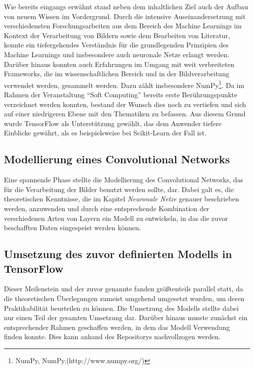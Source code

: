 Wie bereits eingangs erwähnt stand neben dem inhaltlichen Ziel auch der Aufbau von neuem Wissen im Vordergrund. Durch die
intensive Auseinandersetzung mit verschiedensten Forschungsarbeiten aus dem Bereich des Machine Learnings im Kontext der
Verarbeitung von Bildern sowie dem Bearbeiten von Literatur, konnte ein tiefergehendes Verständnis für die grundlegenden
Prinzipien des Machine Learnings und insbesondere auch neuronale Netze erlangt werden.
Darüber hinaus konnten auch Erfahrungen im Umgang mit weit verbreiteten Frameworks, die im wissenschaftlichen Bereich und
in der Bildverarbeitung verwendet werden, gesammelt werden. Dazu zählt insbesondere NumPy\footnote{NumPy, NumPy.\newline(http://www.numpy.org/)}.
Da im Rahmen der Veranstaltung ``Soft Computing'' bereits erste Berührungspunkte verzeichnet werden konnten, bestand der
Wunsch dies noch zu vertiefen und sich auf einer niedrigeren Ebene mit den Thematiken zu befassen. Aus diesem Grund wurde
TensorFlow als Unterstützung gewählt, das dem Anwender tiefere Einblicke gewährt, als es beispielsweise bei Scikit-Learn
der Fall ist.

\subsection{Modellierung eines Convolutional Networks}

Eine spannende Phase stellte die Modellierung des Convolutional Networks, das für die Verarbeitung der Bilder benutzt
werden sollte, dar. Dabei galt es, die theoretischen Kenntnisse, die im Kapitel \textit{Neuronale Netze} genauer
beschrieben werden, anzuwenden und durch eine entsprechende Kombination der verschiedenen Arten von Layern ein Modell
zu entwickeln, in das die zuvor beschafften Daten eingespeist werden können.

\subsection{Umsetzung des zuvor definierten Modells in TensorFlow}

Dieser Meilenstein und der zuvor genannte fanden größtenteils parallel statt, da die theoretischen Überlegungen zumeist
umgehend umgesetzt wurden, um deren Praktikabilität beurteilen zu können. Die Umsetzung des Modells stellte dabei nur
einen Teil der gesamten Umsetzung dar. Darüber hinaus musste zunächst ein entsprechender Rahmen geschaffen werden, in
dem das Modell Verwendung finden konnte. Dies kann anhand des Repositorys nachvollzogen werden.

